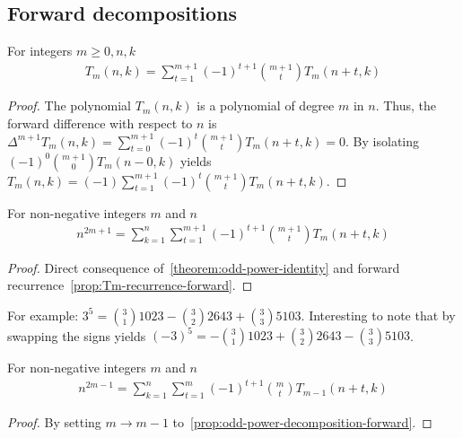 \subsection{Forward decompositions}
\label{subsec:forward-decompositions}
\begin{proposition}
    For integers $m\geq 0, n, k$
    \label{prop:Tm-recurrence-forward}
    \begin{align*}
        T_{m} (n,k) = \sum_{t=1}^{m+1} (-1)^{t+1} \binom{m+1}{t} T_{m} (n+t, k)
    \end{align*}
    \begin{proof}
        The polynomial $T_{m} (n,k)$ is a polynomial of degree $m$ in $n$.
        Thus, the forward difference with respect to $n$ is
        $\Delta^{m+1} T_{m} (n, k) = \sum_{t=0}^{m+1} (-1)^{t} \binom{m+1}{t} T_{m} (n+t, k) = 0$.
        By isolating $(-1)^{0} \binom{m+1}{0} T_{m} (n-0, k)$ yields
        $T_{m} (n, k) = (-1) \sum_{t=1}^{m+1} (-1)^{t} \binom{m+1}{t} T_{m} (n+t, k)$.
    \end{proof}
\end{proposition}

\begin{proposition}
    \label{prop:odd-power-decomposition-forward}
    For non-negative integers $m$ and $n$
    \begin{align*}
        n^{2m+1} = \sum_{k=1}^{n} \sum_{t=1}^{m+1} (-1)^{t+1} \binom{m+1}{t} T_{m} (n+t, k)
    \end{align*}
    \begin{proof}
        Direct consequence of~\eqref{theorem:odd-power-identity}
        and forward recurrence~\eqref{prop:Tm-recurrence-forward}.
    \end{proof}
\end{proposition}
For example: $3^5 = \binom{3}{1} 1023 - \binom{3}{2} 2643 + \binom{3}{3} 5103$.
Interesting to note that by swapping the signs yields
$(-3)^5 = -\binom{3}{1} 1023 + \binom{3}{2} 2643 - \binom{3}{3} 5103$.

\begin{proposition}
    \label{prop:odd-power-decomposition-forward-m-1}
    For non-negative integers $m$ and $n$
    \begin{align*}
        n^{2m-1} = \sum_{k=1}^{n} \sum_{t=1}^{m} (-1)^{t+1} \binom{m}{t} T_{m-1} (n+t, k)
    \end{align*}
    \begin{proof}
        By setting $m \rightarrow m-1$ to~\eqref{prop:odd-power-decomposition-forward}.
    \end{proof}
\end{proposition}

